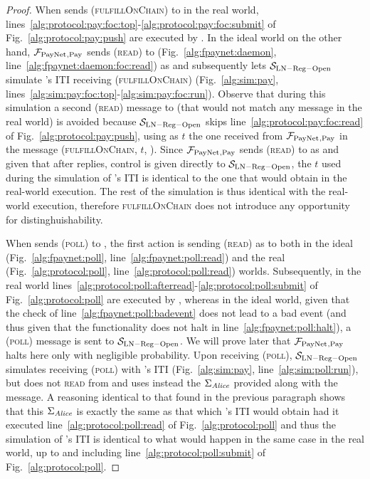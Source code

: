 \begin{proof}
  When \environment{} sends (\textsc{fulfillOnChain}) to \alice{} in the real
  world, lines~\ref{alg:protocol:pay:foc:top}-\ref{alg:protocol:pay:foc:submit}
  of Fig.~\ref{alg:protocol:pay:push} are executed by \alice. In the ideal world
  on the other hand, $\mathcal{F}_{\mathrm{PayNet}}{}_{\mathrm{, Pay}}$ sends (\textsc{read}) to
  \ledger{} (Fig.~\ref{alg:fpaynet:daemon},
  line~\ref{alg:fpaynet:daemon:foc:read}) as \alice{} and subsequently lets
  $\mathcal{S}_{\mathrm{LN - Reg - Open}}$ simulate \alice{}'s ITI receiving
  (\textsc{fulfillOnChain}) (Fig.~\ref{alg:sim:pay},
  lines~\ref{alg:sim:pay:foc:top}-\ref{alg:sim:pay:foc:run}). Observe that
  during this simulation a second (\textsc{read}) message to \ledger{} (that
  would not match any message in the real world) is avoided because
  $\mathcal{S}_{\mathrm{LN - Reg - Open}}$ skips
  line~\ref{alg:protocol:pay:foc:read} of Fig.~\ref{alg:protocol:pay:push},
  using as $t$ the one received from $\mathcal{F}_{\mathrm{PayNet}}{}_{\mathrm{, Pay}}$ in the
  message (\textsc{fulfillOnChain}, $t$, \alice). Since $\mathcal{F}_{\mathrm{PayNet}}{}_{\mathrm{,
  Pay}}$ sends (\textsc{read}) to \ledger{} as \alice{} and given that after
  \ledger{} replies, control is given directly to $\mathcal{S}_{\mathrm{LN - Reg
  - Open}}$, the $t$ used during the simulation of \alice's ITI is identical to
  the one that \alice{} would obtain in the real-world execution. The rest of
  the simulation is thus identical with the real-world execution, therefore
  \textsc{fulfillOnChain} does not introduce any opportunity for
  distinghuishability.

  When \environment{} sends (\textsc{poll}) to \alice, the first action is
  sending (\textsc{read}) as \alice{} to \ledger{} both in the ideal
  (Fig.~\ref{alg:fpaynet:poll}, line~\ref{alg:fpaynet:poll:read}) and the real
  (Fig.~\ref{alg:protocol:poll}, line~\ref{alg:protocol:poll:read}) worlds.
  Subsequently, in the real world
  lines~\ref{alg:protocol:poll:afterread}-\ref{alg:protocol:poll:submit} of
  Fig.~\ref{alg:protocol:poll} are executed by \alice, whereas in the ideal
  world, given that the check of line~\ref{alg:fpaynet:poll:badevent} does not
  lead to a bad event (and thus given that the functionality does not halt in
  line~\ref{alg:fpaynet:poll:halt}), a (\textsc{poll}) message is sent to
  $\mathcal{S}_{\mathrm{LN - Reg - Open}}$. We will prove later that
  $\mathcal{F}_{\mathrm{PayNet}}{}_{\mathrm{, Pay}}$ halts here only with negligible probability.
  Upon receiving (\textsc{poll}), $\mathcal{S}_{\mathrm{LN - Reg - Open}}$
  simulates receiving (\textsc{poll}) with \alice's ITI (Fig.~\ref{alg:sim:pay},
  line~\ref{alg:sim:poll:run}), but does not \textsc{read} from \ledger{} and
  uses instead the $\Sigma_{\mathit{Alice}}$ provided along with the message. A
  reasoning identical to that found in the previous paragraph shows that this
  $\Sigma_{\mathit{Alice}}$ is exactly the same as that which \alice's ITI would obtain
  had it executed line~\ref{alg:protocol:poll:read} of
  Fig.~\ref{alg:protocol:poll} and thus the simulation of \alice's ITI is
  identical to what would happen in the same case in the real world, up to and
  including line~\ref{alg:protocol:poll:submit} of Fig.~\ref{alg:protocol:poll}.


\end{proof}
